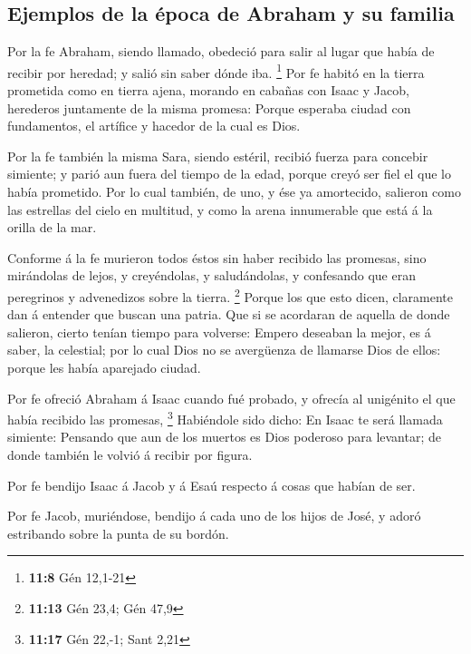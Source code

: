 \hypertarget{ejemplos-de-la-uxe9poca-de-abraham-y-su-familia}{%
\subsection{Ejemplos de la época de Abraham y su
familia}\label{ejemplos-de-la-uxe9poca-de-abraham-y-su-familia}}

 Por la fe Abraham, siendo llamado, obedeció para salir al
lugar que había de recibir por heredad; y salió sin saber dónde iba.
\footnote{\textbf{11:8} Gén 12,1-21}  Por fe habitó en la
tierra prometida como en tierra ajena, morando en cabañas con Isaac y
Jacob, herederos juntamente de la misma promesa:  Porque
esperaba ciudad con fundamentos, el artífice y hacedor de la cual es
Dios.

 Por la fe también la misma Sara, siendo estéril, recibió
fuerza para concebir simiente; y parió aun fuera del tiempo de la edad,
porque creyó ser fiel el que lo había prometido.  Por lo
cual también, de uno, y ése ya amortecido, salieron como las estrellas
del cielo en multitud, y como la arena innumerable que está á la orilla
de la mar.

 Conforme á la fe murieron todos éstos sin haber recibido
las promesas, sino mirándolas de lejos, y creyéndolas, y saludándolas, y
confesando que eran peregrinos y advenedizos sobre la tierra.
\footnote{\textbf{11:13} Gén 23,4; Gén 47,9}  Porque los
que esto dicen, claramente dan á entender que buscan una patria.
 Que si se acordaran de aquella de donde salieron, cierto
tenían tiempo para volverse:  Empero deseaban la mejor, es
á saber, la celestial; por lo cual Dios no se avergüenza de llamarse
Dios de ellos: porque les había aparejado ciudad.

 Por fe ofreció Abraham á Isaac cuando fué probado, y
ofrecía al unigénito el que había recibido las promesas, \footnote{\textbf{11:17}
  Gén 22,-1; Sant 2,21}  Habiéndole sido dicho: En Isaac te
será llamada simiente:  Pensando que aun de los muertos es
Dios poderoso para levantar; de donde también le volvió á recibir por
figura.

 Por fe bendijo Isaac á Jacob y á Esaú respecto á cosas que
habían de ser.

 Por fe Jacob, muriéndose, bendijo á cada uno de los hijos
de José, y adoró estribando sobre la punta de su bordón.

